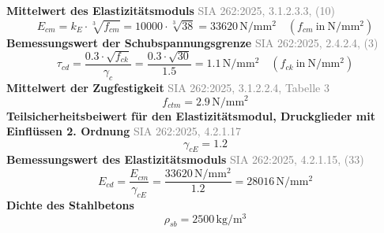 \documentclass[11pt,a4paper]{article}
\newcommand{\normref}[1]{{\small\textcolor{gray}{#1}}}
\begin{document}
\noindent\textbf{Mittelwert des Elastizitätsmoduls} \hfill \normref{SIA 262:2025, 3.1.2.3.3, (10)}
\begin{equation*}
E_{cm} = k_E \cdot \sqrt[3]{f_{cm}} = 10000 \cdot \sqrt[3]{38} = 33620\,\mathrm{N}/\mathrm{mm}^{2} \quad \left(f_{cm}\ \text{in}\ \mathrm{N}/\mathrm{mm}^{2}\right)
\end{equation*}
\noindent\textbf{Bemessungswert der Schubspannungsgrenze} \hfill \normref{SIA 262:2025, 2.4.2.4, (3)}
\begin{equation*}
\tau_{cd} = \frac{0.3 \cdot \sqrt{f_{ck}}}{\gamma_c} = \frac{0.3 \cdot \sqrt{30}}{1.5} = 1.1\,\mathrm{N}/\mathrm{mm}^{2} \quad \left(f_{ck}\ \text{in}\ \mathrm{N}/\mathrm{mm}^{2}\right)
\end{equation*}
\noindent\textbf{Mittelwert der Zugfestigkeit} \hfill \normref{SIA 262:2025, 3.1.2.2.4, Tabelle 3}
\begin{equation*}
f_{ctm} = 2.9\,\mathrm{N}/\mathrm{mm}^{2}
\end{equation*}
\noindent\textbf{Teilsicherheitsbeiwert für den Elastizitätsmodul, Druckglieder mit Einflüssen 2. Ordnung} \hfill \normref{SIA 262:2025, 4.2.1.17}
\begin{equation*}
\gamma_{cE} = 1.2
\end{equation*}
\noindent\textbf{Bemessungswert des Elastizitätsmoduls} \hfill \normref{SIA 262:2025, 4.2.1.15, (33)}
\begin{equation*}
E_{cd} = \frac{E_{cm}}{\gamma_{cE}} = \frac{33620\,\mathrm{N}/\mathrm{mm}^{2}}{1.2} = 28016\,\mathrm{N}/\mathrm{mm}^{2}
\end{equation*}
\noindent\textbf{Dichte des Stahlbetons}
\begin{equation*}
\rho_{sb} = 2500\,\mathrm{kg}/\mathrm{m}^{3}
\end{equation*}
\end{document}
